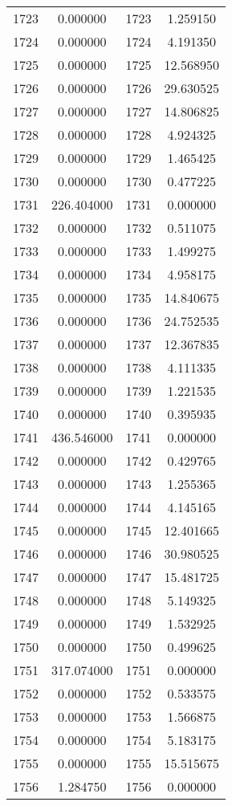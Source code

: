 \documentclass[12pt]{article}
\begin{document}
\begin{longtable}{@{}cccc@{}}
1723 & 0.000000 & 1723 & 1.259150 \\
1724 & 0.000000 & 1724 & 4.191350 \\
1725 & 0.000000 & 1725 & 12.568950 \\
1726 & 0.000000 & 1726 & 29.630525 \\
1727 & 0.000000 & 1727 & 14.806825 \\
1728 & 0.000000 & 1728 & 4.924325 \\
1729 & 0.000000 & 1729 & 1.465425 \\
1730 & 0.000000 & 1730 & 0.477225 \\
1731 & 226.404000 & 1731 & 0.000000 \\
1732 & 0.000000 & 1732 & 0.511075 \\
1733 & 0.000000 & 1733 & 1.499275 \\
1734 & 0.000000 & 1734 & 4.958175 \\
1735 & 0.000000 & 1735 & 14.840675 \\
1736 & 0.000000 & 1736 & 24.752535 \\
1737 & 0.000000 & 1737 & 12.367835 \\
1738 & 0.000000 & 1738 & 4.111335 \\
1739 & 0.000000 & 1739 & 1.221535 \\
1740 & 0.000000 & 1740 & 0.395935 \\
1741 & 436.546000 & 1741 & 0.000000 \\
1742 & 0.000000 & 1742 & 0.429765 \\
1743 & 0.000000 & 1743 & 1.255365 \\
1744 & 0.000000 & 1744 & 4.145165 \\
1745 & 0.000000 & 1745 & 12.401665 \\
1746 & 0.000000 & 1746 & 30.980525 \\
1747 & 0.000000 & 1747 & 15.481725 \\
1748 & 0.000000 & 1748 & 5.149325 \\
1749 & 0.000000 & 1749 & 1.532925 \\
1750 & 0.000000 & 1750 & 0.499625 \\
1751 & 317.074000 & 1751 & 0.000000 \\
1752 & 0.000000 & 1752 & 0.533575 \\
1753 & 0.000000 & 1753 & 1.566875 \\
1754 & 0.000000 & 1754 & 5.183175 \\
1755 & 0.000000 & 1755 & 15.515675 \\
1756 & 1.284750 & 1756 & 0.000000 \\

\end{longtable}
\end{document}
